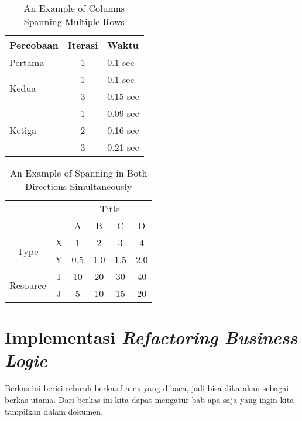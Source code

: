 \begin{table}
	\centering
	\caption{An Example of Columns Spanning Multiple Rows}
	\label{column.spanning}
	\begin{tabular}{|l|c|l|}
		\hline
		Percobaan & Iterasi & Waktu \\
		\hline
		Pertama & 1 & 0.1 sec \\ \hline
		\multirow{2}{*}{Kedua} & 1 & 0.1 sec \\
 		& 3 & 0.15 sec \\ 
 		\hline
		\multirow{3}{*}{Ketiga} & 1 & 0.09 sec \\
 		& 2 & 0.16 sec \\
 		& 3 & 0.21 sec \\ 
 		\hline
	\end{tabular}
\end{table}

\begin{table}
	\centering
	\caption{An Example of Spanning in Both Directions Simultaneously}
	\label{mix.spanning}
	\begin{tabular}{cc|c|c|c|c|}
		\cline{3-6}
		& & \multicolumn{4}{|c|}{Title} \\ \cline{3-6}
		& & A & B & C & D \\ \hline
		\multicolumn{1}{|c|}{\multirow{2}{*}{Type}} &
		\multicolumn{1}{|c|}{X} & 1 & 2 & 3 & 4\\ \cline{2-6}
		\multicolumn{1}{|c|}{}                        &
		\multicolumn{1}{|c|}{Y} & 0.5 & 1.0 & 1.5 & 2.0\\ \cline{1-6}
		\multicolumn{1}{|c|}{\multirow{2}{*}{Resource}} &
		\multicolumn{1}{|c|}{I} & 10 & 20 & 30 & 40\\ \cline{2-6}
		\multicolumn{1}{|c|}{}                        &
		\multicolumn{1}{|c|}{J} & 5 & 10 & 15 & 20\\ \cline{1-6}
	\end{tabular}
\end{table}

\section{Implementasi \textit{Refactoring Business Logic}}
Berkas ini berisi seluruh berkas Latex yang dibaca, jadi bisa dikatakan sebagai 
berkas utama. Dari berkas ini kita dapat mengatur bab apa saja yang ingin 
kita tampilkan dalam dokumen.


